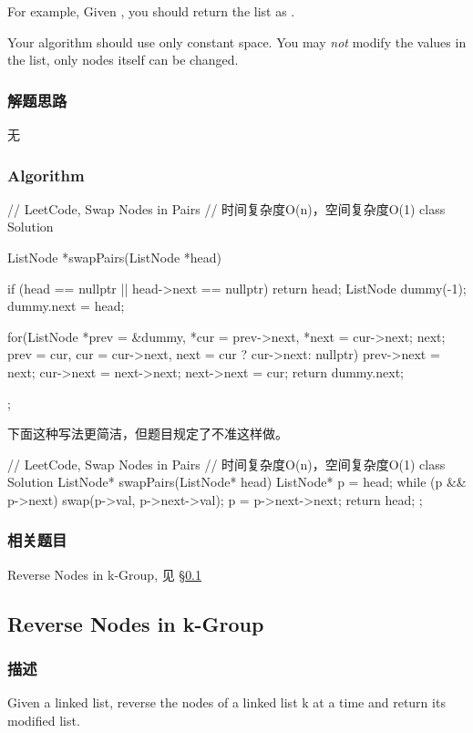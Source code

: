 For example,
Given , you should return the list as .

Your algorithm should use only constant space. You may \emph{not} modify the 
values in the list, only nodes itself can be changed.


\subsubsection{解题思路}
无


\subsubsection{Algorithm}
\begin{Code}
	// LeetCode, Swap Nodes in Pairs
	// 时间复杂度O(n)，空间复杂度O(1)
	class Solution {
		ListNode *swapPairs(ListNode *head) {
			if (head == nullptr || head->next == nullptr) return head;
			ListNode dummy(-1);
			dummy.next = head;
			
			for(ListNode *prev = &dummy, *cur = prev->next, *next = cur->next; next;
				prev = cur, cur = cur->next, next = cur ? cur->next: nullptr) {
				prev->next = next;
				cur->next = next->next;
				next->next = cur;
			}
			return dummy.next;
		}
	};
\end{Code}

下面这种写法更简洁，但题目规定了不准这样做。
\begin{Code}
	// LeetCode, Swap Nodes in Pairs
	// 时间复杂度O(n)，空间复杂度O(1)
	class Solution {
		ListNode* swapPairs(ListNode* head) {
			ListNode* p = head;
			while (p && p->next) {
				swap(p->val, p->next->val);
				p = p->next->next;
			}
			return head;
		}
	};
\end{Code}

\subsubsection{相关题目}

\begindot
\item Reverse Nodes in k-Group, 见 \S \ref{sec:reverse-nodes-in-k-group}
\myenddot


\subsection{Reverse Nodes in k-Group}
\label{sec:reverse-nodes-in-k-group}


\subsubsection{描述}
Given a linked list, reverse the nodes of a linked list k at a time and return 
its modified list.

